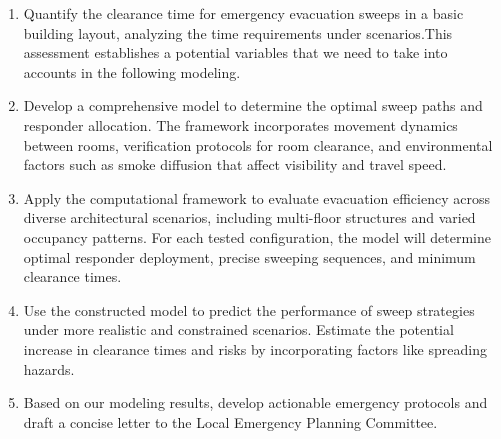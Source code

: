 
\begin{enumerate}[\bfseries 1.]%
	\setlength{\parsep}{0ex} %
	\setlength{\topsep}{0.5pt} %
	\setlength{\itemsep}{0.5pt} %
	\item Quantify the clearance time for emergency evacuation sweeps in a basic building layout, analyzing the time requirements under scenarios.This assessment establishes a potential variables that we need to take into accounts in the following modeling. 
	\item Develop a comprehensive model to determine the optimal sweep paths and responder allocation. The framework incorporates movement dynamics between rooms, verification protocols for room clearance, and environmental factors such as smoke diffusion that affect visibility and travel speed. 
 
	\item Apply the computational framework to evaluate evacuation efficiency across diverse architectural scenarios, including multi-floor structures and varied occupancy patterns. For each tested configuration, the model will determine optimal responder deployment, precise sweeping sequences, and minimum clearance times.
    \item Use the constructed model to predict the performance of sweep strategies under more realistic and constrained scenarios. Estimate the potential increase in clearance times and risks by incorporating factors like spreading hazards.
    \item Based on our modeling results, develop actionable emergency protocols and draft a concise letter to the Local Emergency Planning Committee.
\end{enumerate}

\vspace{-0.5cm}%


